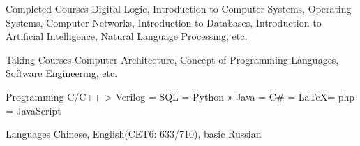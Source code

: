 

\begin{cvskills}

  \cvskill
    {Completed Courses} %
    {Digital Logic, Introduction to Computer Systems, Operating Systems, Computer Networks, Introduction to Databases, Introduction to Artificial Intelligence, Natural Language Processing, etc.} %

  \cvskill
    {Taking Courses} %
    {Computer Architecture, Concept of Programming Languages, Software Engineering, etc.} %

  \cvskill
    {Programming} %
    {C/C++ > Verilog = SQL = Python » Java = C\# = \LaTeX = php = JavaScript} %

  \cvskill
    {Languages} %
    {Chinese, English(CET6: 633/710), basic Russian} %

\end{cvskills}
